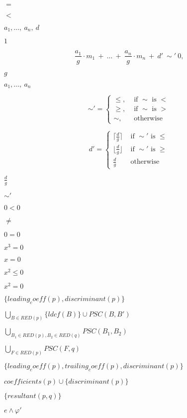 \documentclass{article}
\begin{document}
$=$
\pagebreak

$<$
\pagebreak

$a_1,\ldots,\ a_n,\ d$
\pagebreak

$1$
\pagebreak

\[\frac{a_1}{g}\cdot m_1\ +\ \ldots\ +\ \frac{a_n}{g}\cdot m_n\ + \ d'\ \sim' \ 0,\]
\pagebreak

$g$
\pagebreak

$a_1,\ldots,\ a_n$
\pagebreak

\[\sim'=\left\{ \begin{array}{ll} \leq, &\text{ if }\sim\text{ is }< \\ \geq, &\text{ if }\sim\text{ is }> \\ \sim, &\text{ otherwise } \end{array} \right.\]
\pagebreak

\[ d' = \left\{ \begin{array}{ll} \lceil\frac{d}{g}\rceil &\text{ if }\sim'\text{ is }\leq \\ \lfloor\frac{d}{g}\rfloor &\text{ if }\sim'\text{ is }\geq \\ \frac{d}{g} &\text{ otherwise } \end{array} \right.\]
\pagebreak

$\frac{d}{g}$
\pagebreak

$\sim'$
\pagebreak

$0<0$
\pagebreak

$\neq$
\pagebreak

$0=0$
\pagebreak

$x^3=0$
\pagebreak

$x=0$
\pagebreak

$x^2\leq 0$
\pagebreak

$x^2=0$
\pagebreak

$ \{ leading_coeff(p), discriminant(p) \} $
\pagebreak

$ \bigcup_{B \in RED(p)} \{ ldcf(B) \} \cup PSC(B, B') $
\pagebreak

$ \bigcup_{B_1 \in RED(p), B_2 \in RED(q)} PSC(B_1, B_2) $
\pagebreak

$ \bigcup_{F \in RED(p)} PSC(F, q) $
\pagebreak

$ \{ leading_coeff(p), trailing_coeff(p), discriminant(p) \} $
\pagebreak

$ coefficients(p) \cup \{ discriminant(p) \} $
\pagebreak

$ \{ resultant(p, q) \} $
\pagebreak

$ e \land \varphi' $
\pagebreak
\end{document}
